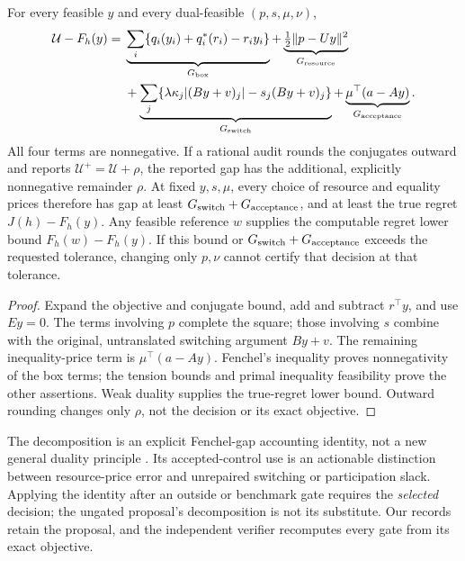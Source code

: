 \begin{theorem}\label{thm:r22-decomposition}
For every feasible $y$ and every dual-feasible $(p,s,\mu,\nu)$,
\begin{align}
 \mathcal U-F_h(y)
 ={}&\underbrace{\sum_i\{q_i(y_i)+q_i^*(r_i)-r_iy_i\}}_{G_{\rm box}}
 +\underbrace{\tfrac12\|p-Uy\|^2}_{G_{\rm resource}}\nonumber\\
 &+\underbrace{\sum_j\{\lambda\kappa_j|(By+v)_j|-s_j(By+v)_j\}}_{G_{\rm switch}}
 +\underbrace{\mu^\top(a-Ay)}_{G_{\rm acceptance}}.\label{eq:r22-components}
\end{align}
All four terms are nonnegative. If a rational audit rounds the conjugates outward and reports $\mathcal U^+=\mathcal U+\rho$, the reported gap has the additional, explicitly nonnegative remainder $\rho$. At fixed $y,s,\mu$, every choice of resource and equality prices therefore has gap at least
$G_{\rm switch}+G_{\rm acceptance}$, and at least the true regret $J(h)-F_h(y)$. Any feasible reference $w$ supplies the computable regret lower bound $F_h(w)-F_h(y)$. If this bound or $G_{\rm switch}+G_{\rm acceptance}$ exceeds the requested tolerance, changing only $p,\nu$ cannot certify that decision at that tolerance.
\end{theorem}
\begin{proof}
Expand the objective and conjugate bound, add and subtract $r^\top y$, and use $Ey=0$. The terms involving $p$ complete the square; those involving $s$ combine with the original, untranslated switching argument $By+v$. The remaining inequality-price term is $\mu^\top(a-Ay)$. Fenchel's inequality proves nonnegativity of the box terms; the tension bounds and primal inequality feasibility prove the other assertions. Weak duality supplies the true-regret lower bound. Outward rounding changes only $\rho$, not the decision or its exact objective.
\end{proof}
The decomposition is an explicit Fenchel-gap accounting identity, not a new general duality principle \citep{BoydVandenberghe2004}. Its accepted-control use is an actionable distinction between resource-price error and unrepaired switching or participation slack. Applying the identity after an outside or benchmark gate requires the \emph{selected} decision; the ungated proposal's decomposition is not its substitute. Our records retain the proposal, and the independent verifier recomputes every gate from its exact objective.

